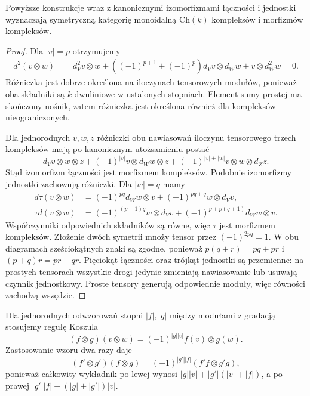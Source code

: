 \begin{stwierdzenie}\label{cat:prop:dg-tensor-monoidal}
Powyższe konstrukcje wraz z kanonicznymi izomorfizmami łączności i jednostki wyznaczają symetryczną kategorię monoidalną $\mathrm{Ch}(k)$ kompleksów i morfizmów kompleksów.
\end{stwierdzenie}
\begin{proof}
Dla $|v|=p$ otrzymujemy
\[
\begin{aligned}
 d^2(v\otimes w)
 &=d_V^2v\otimes w+
 ((-1)^{p+1}+(-1)^p)d_Vv\otimes d_Ww
 +v\otimes d_W^2w=0.
\end{aligned}
\]
Różniczka jest dobrze określona na iloczynach tensorowych modułów, ponieważ oba składniki są $k$-dwuliniowe w ustalonych stopniach. Element sumy prostej ma skończony nośnik, zatem różniczka jest określona również dla kompleksów nieograniczonych.

Dla jednorodnych $v,w,z$ różniczki obu nawiasowań iloczynu tensorowego trzech kompleksów mają po kanonicznym utożsamieniu postać
\[
 d_Vv\otimes w\otimes z+
 (-1)^{|v|}v\otimes d_Ww\otimes z+
 (-1)^{|v|+|w|}v\otimes w\otimes d_Zz.
\]
Stąd izomorfizm łączności jest morfizmem kompleksów. Podobnie izomorfizmy jednostki zachowują różniczki. Dla $|w|=q$ mamy
\[
\begin{aligned}
 d\tau(v\otimes w)
 &=(-1)^{pq}d_Ww\otimes v+
   (-1)^{pq+q}w\otimes d_Vv,\\
 \tau d(v\otimes w)
 &=(-1)^{(p+1)q}w\otimes d_Vv+
   (-1)^{p+p(q+1)}d_Ww\otimes v.
\end{aligned}
\]
Współczynniki odpowiednich składników są równe, więc $\tau$ jest morfizmem kompleksów. Złożenie dwóch symetrii mnoży tensor przez $(-1)^{2pq}=1$. W obu diagramach sześciokątnych znaki są zgodne, ponieważ $p(q+r)=pq+pr$ i $(p+q)r=pr+qr$. Pięciokąt łączności oraz trójkąt jednostki są przemienne: na prostych tensorach wszystkie drogi jedynie zmieniają nawiasowanie lub usuwają czynnik jednostkowy. Proste tensory generują odpowiednie moduły, więc równości zachodzą wszędzie.
\end{proof}

Dla jednorodnych odwzorowań stopni $|f|,|g|$ między modułami z gradacją stosujemy regułę Koszula
\begin{equation}\label{cat:eq:dg-koszul-tensor}
 (f\otimes g)(v\otimes w)=(-1)^{|g||v|}f(v)\otimes g(w).
\end{equation}
Zastosowanie wzoru dwa razy daje
\[
 (f'\otimes g')(f\otimes g)
 =(-1)^{|g'||f|}(f'f\otimes g'g),
\]
ponieważ całkowity wykładnik po lewej wynosi
$|g||v|+|g'|(|v|+|f|)$, a po prawej
$|g'||f|+(|g|+|g'|)|v|$.

